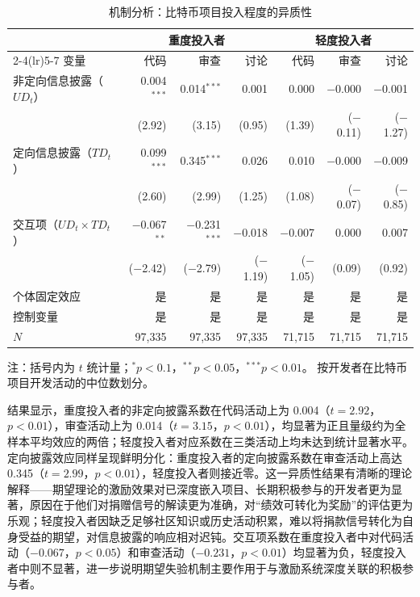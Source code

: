 \begin{table}[htbp]
    \centering
    \caption{机制分析：比特币项目投入程度的异质性}
    \label{tab:mechanism-heavy-light}
    \small
    \begin{tabularx}{\textwidth}{Xrrrrrr}
        \toprule
        & \multicolumn{3}{c}{重度投入者}
        & \multicolumn{3}{c}{轻度投入者} \\
        \cmidrule(lr){2-4}\cmidrule(lr){5-7}
        变量 & 代码 & 审查 & 讨论 & 代码 & 审查 & 讨论 \\
        \midrule
        非定向信息披露（$UD_t$）
            & 0.004$^{***}$ & 0.014$^{***}$ & 0.001
            & 0.000 & $-$0.000 & $-$0.001 \\
            & (2.92) & (3.15) & (0.95)
            & (1.39) & ($-$0.11) & ($-$1.27) \\[0.4em]
        定向信息披露（$TD_t$）
            & 0.099$^{***}$ & 0.345$^{***}$ & 0.026
            & 0.010 & $-$0.000 & $-$0.009 \\
            & (2.60) & (2.99) & (1.25)
            & (1.08) & ($-$0.07) & ($-$0.85) \\[0.4em]
        交互项（$UD_t \times TD_t$）
            & $-$0.067$^{**}$ & $-$0.231$^{***}$ & $-$0.018
            & $-$0.007 & 0.000 & 0.007 \\
            & ($-$2.42) & ($-$2.79) & ($-$1.19)
            & ($-$1.05) & (0.09) & (0.92) \\[0.4em]
        \midrule
        个体固定效应 & 是 & 是 & 是 & 是 & 是 & 是 \\
        控制变量 & 是 & 是 & 是 & 是 & 是 & 是 \\
        $N$ & 97,335 & 97,335 & 97,335 & 71,715 & 71,715 & 71,715 \\
        \bottomrule
    \end{tabularx}
    \begin{minipage}{\textwidth}
        \vspace{0.3em}
        \footnotesize 注：括号内为 $t$ 统计量；$^{*}p<0.1$，$^{**}p<0.05$，$^{***}p<0.01$。
        按开发者在比特币项目开发活动的中位数划分。
    \end{minipage}
\end{table}

结果显示，重度投入者的非定向披露系数在代码活动上为 0.004（$t = 2.92$，$p < 0.01$），审查活动上为 0.014（$t = 3.15$，$p < 0.01$），均显著为正且量级约为全样本平均效应的两倍；轻度投入者对应系数在三类活动上均未达到统计显著水平。定向披露效应同样呈现鲜明分化：重度投入者的定向披露系数在审查活动上高达 0.345（$t = 2.99$，$p < 0.01$），轻度投入者则接近零。这一异质性结果有清晰的理论解释——期望理论的激励效果对已深度嵌入项目、长期积极参与的开发者更为显著，原因在于他们对捐赠信号的解读更为准确，对“绩效可转化为奖励”的评估更为乐观；轻度投入者因缺乏足够社区知识或历史活动积累，难以将捐款信号转化为自身受益的期望，对信息披露的响应相对迟钝。交互项系数在重度投入者中对代码活动（$-0.067$，$p < 0.05$）和审查活动（$-0.231$，$p < 0.01$）均显著为负，轻度投入者中则不显著，进一步说明期望失验机制主要作用于与激励系统深度关联的积极参与者。

